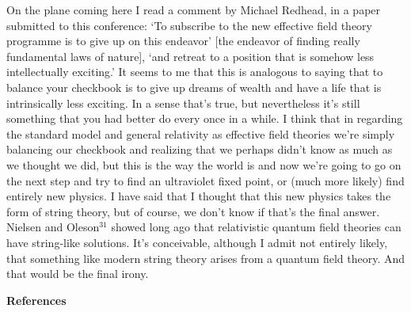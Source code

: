 \documentclass[12pt]{article}
\begin{document}
On the plane coming here I read a comment by Michael
Redhead, in a paper submitted to this conference: `To
subscribe to the new effective field theory programme is to
give up on this endeavor' [the endeavor of finding really
fundamental laws of nature], `and retreat to a position that
is somehow less intellectually exciting.'   It seems to me
that this is analogous to saying that to balance your
checkbook is to give up dreams of wealth and have a life
that is intrinsically less exciting.  In a sense that's
true,  but nevertheless it's still something that
you had better do every once in a while.  I think that in
regarding the standard model and general relativity as
effective field theories we're simply balancing our
checkbook and realizing that we perhaps didn't know as much
as we thought we did,  but this is the way the world is and
now we're going to go on the next step and try to find an
ultraviolet fixed point, or (much more likely) find entirely
new physics.     I have said that I thought that this new
physics takes the form of  string theory,  but of course, we
don't know if that's the final answer.   Nielsen and
Oleson$^{31}$
showed long ago that relativistic quantum field theories can
have string-like solutions.   It's conceivable, although I
admit not entirely likely,  that something like modern
string theory arises from a quantum field theory.  And that
would be the final irony.



\pagebreak

\begin{center}
{\bf References}
\end{center}
\end{document}
